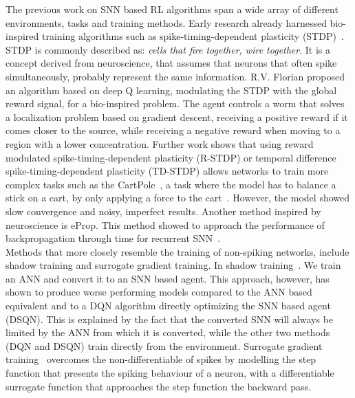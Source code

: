The previous work on SNN based RL algorithms span a wide array of different environments, tasks and training methods. Early research already harnessed bio-inspired training algorithms such as spike-timing-dependent plasticity (STDP)~\cite{STDP_survey}. STDP is commonly described as: \textit{cells that fire together, wire together}. It is a concept derived from neuroscience, that assumes that neurons that often spike simultaneously, probably represent the same information. R.V. Florian\cite{florian_reinforcement_2005} proposed an algorithm based on deep Q learning, modulating the STDP with the global reward signal, for a bio-inspired problem. The agent controls a worm that solves a localization problem based on gradient descent, receiving a positive reward if it comes closer to the source, while receiving a negative reward when moving to a region with a lower concentration. Further work shows that using reward modulated spike-timing-dependent plasticity (R-STDP) or temporal difference spike-timing-dependent plasticity (TD-STDP) allows networks to train more complex tasks such as the CartPole~\cite{liu_spiking_2023}, a task where the model has to balance a stick on a cart, by only applying a force to the cart~\cite{CartPole}. However, the model showed slow convergence and noisy, imperfect results. Another method inspired by neuroscience is eProp. This method showed to approach the performance of backpropagation through time for recurrent SNN~\cite{eProp_pong}.
\\
Methods that more closely resemble the training of non-spiking networks, include shadow training and surrogate gradient training. In shadow training~\cite{ding2021optimal}. We train an ANN and convert it to an SNN based agent. This approach, however, has shown to produce worse performing models compared to the ANN based equivalent and to a DQN algorithm directly optimizing the SNN based agent (DSQN)\cite{ding_chen_deep_2022}. This is explained by the fact that the converted SNN will always be limited by the ANN from which it is converted, while the other two methods (DQN and DSQN) train directly from the environment. Surrogate gradient training~\cite{neftci2019surrogate} overcomes the non-differentiable of spikes by modelling the step function that presents the spiking behaviour of a neuron, with a differentiable surrogate function that approaches the step function the backward pass.
